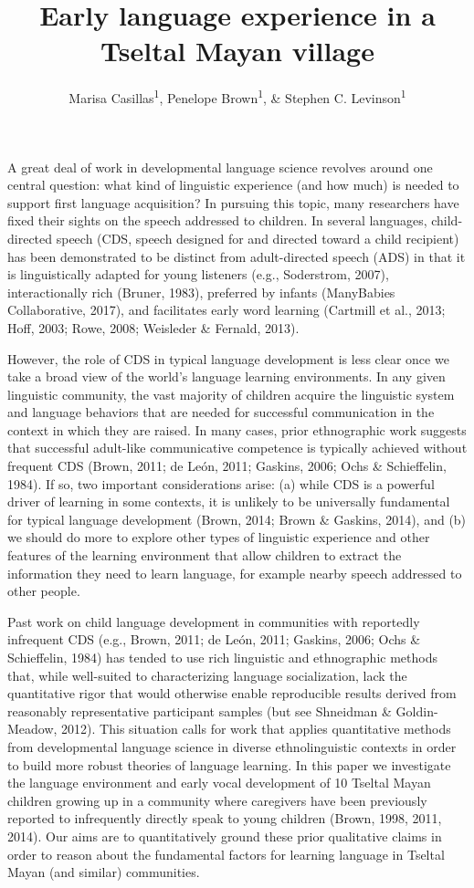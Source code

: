 \documentclass[,man,floatsintext]{apa6}
\title{Early language experience in a Tseltal Mayan village}
\author{Marisa Casillas\textsuperscript{1}, Penelope Brown\textsuperscript{1},
\& Stephen C. Levinson\textsuperscript{1}}
\date{}
\affiliation{
\vspace{0.5cm}
\textsuperscript{1} Max Planck Institute for Psycholinguistics}
\begin{document}
\maketitle

A great deal of work in developmental language science revolves around
one central question: what kind of linguistic experience (and how much)
is needed to support first language acquisition? In pursuing this topic,
many researchers have fixed their sights on the speech addressed to
children. In several languages, child-directed speech (CDS, speech
designed for and directed toward a child recipient) has been
demonstrated to be distinct from adult-directed speech (ADS) in that it
is linguistically adapted for young listeners (e.g., Soderstrom, 2007),
interactionally rich (Bruner, 1983), preferred by infants (ManyBabies
Collaborative, 2017), and facilitates early word learning (Cartmill et
al., 2013; Hoff, 2003; Rowe, 2008; Weisleder \& Fernald, 2013).

However, the role of CDS in typical language development is less clear
once we take a broad view of the world's language learning environments.
In any given linguistic community, the vast majority of children acquire
the linguistic system and language behaviors that are needed for
successful communication in the context in which they are raised. In
many cases, prior ethnographic work suggests that successful adult-like
communicative competence is typically achieved without frequent CDS
(Brown, 2011; de León, 2011; Gaskins, 2006; Ochs \& Schieffelin, 1984).
If so, two important considerations arise: (a) while CDS is a powerful
driver of learning in some contexts, it is unlikely to be universally
fundamental for typical language development (Brown, 2014; Brown \&
Gaskins, 2014), and (b) we should do more to explore other types of
linguistic experience and other features of the learning environment
that allow children to extract the information they need to learn
language, for example nearby speech addressed to other people.

Past work on child language development in communities with reportedly
infrequent CDS (e.g., Brown, 2011; de León, 2011; Gaskins, 2006; Ochs \&
Schieffelin, 1984) has tended to use rich linguistic and ethnographic
methods that, while well-suited to characterizing language
socialization, lack the quantitative rigor that would otherwise enable
reproducible results derived from reasonably representative participant
samples (but see Shneidman \& Goldin-Meadow, 2012). This situation calls
for work that applies quantitative methods from developmental language
science in diverse ethnolinguistic contexts in order to build more
robust theories of language learning. In this paper we investigate the
language environment and early vocal development of 10 Tseltal Mayan
children growing up in a community where caregivers have been previously
reported to infrequently directly speak to young children (Brown, 1998,
2011, 2014). Our aims are to quantitatively ground these prior
qualitative claims in order to reason about the fundamental factors for
learning language in Tseltal Mayan (and similar) communities.
\end{document}
